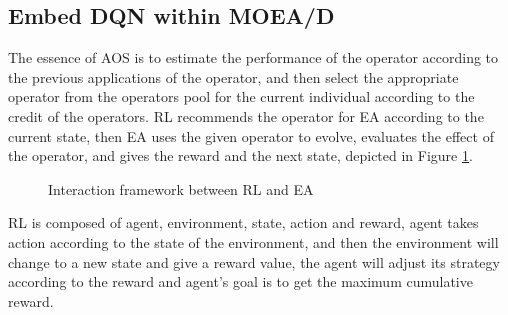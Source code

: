 \documentclass[journal]{IEEEtran}
\begin{document}
\subsection{Embed DQN within MOEA/D}
The essence of AOS is to estimate the performance of the operator according to the previous applications of the operator, and then select the appropriate operator from the operators pool for the current individual according to the credit of the operators.
RL recommends the operator for EA according to the current state, then EA uses the given operator to evolve, evaluates the effect of the operator, and gives the reward and the next state, depicted in Figure \ref{fig:RLEA}.
\begin{figure}[t]
  \centering
  \caption{Interaction framework between RL and EA}
  \label{fig:RLEA}
\end{figure}
RL is composed of agent, environment, state, action and reward, agent takes action according to the state of the environment, and then the environment will change to a new state and give a reward value, the agent will adjust its strategy according to the reward and agent's goal is to get the maximum cumulative reward.
\end{document}
